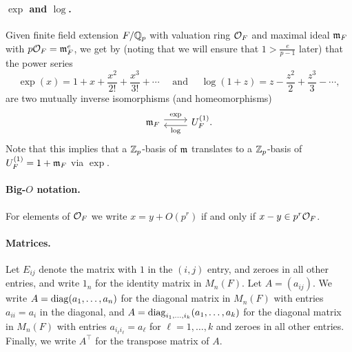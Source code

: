 \paragraph{$\exp$ and $\log$.} Given finite field extension $F/\mathbb{Q}_{p}$ with valuation ring $\mathcal{O}_{F}$ and maximal ideal $\mathfrak{m}_{F}$ with $p\mathcal{O}_{F} = \mathfrak{m}_{F}^{e}$, we get by \cite[Prop.~(5.5)]{Neukirch} (noting that we will ensure that $1 > \frac{e}{p-1}$ later) that the power series
\begin{equation*}
  \exp(x) = 1 + x + \frac{x^{2}}{2!} + \frac{x^{3}}{3!} + \dotsb \quad \text{ and } \quad \log(1+z) = z - \frac{z^{2}}{2} + \frac{z^{3}}{3} - \dotsb,
\end{equation*}
are two mutually inverse isomorphisms (and homeomorphisms)
\[
  \begin{tikzcd}
    \idm_{F} \ar[r, yshift=0.7ex, "\exp"] & U_{F}^{(1)}. \ar[l, yshift=-0.7ex, "\log"]
  \end{tikzcd}
\]
Note that this implies that a $\mathbb{Z}_{p}$-basis of $\mathfrak{m}$ translates to a $\mathbb{Z}_{p}$-basis of $U_{F}^{(1)} = 1+\mathfrak{m}_{F}$ via $\exp$.

\paragraph{Big-$O$ notation.} For elements of $\mathcal{O}_{F}$ we write $x = y + O(p^{r})$ if and only if $x-y \in p^{r}\mathcal{O}_{F}$.

\paragraph{Matrices.} Let $E_{ij}$ denote the matrix with $1$ in the $(i,j)$ entry, and zeroes in all other entries, and write $1_{n}$ for the identity matrix in $M_{n}(F)$. Let $A = (a_{ij})$. We write $A = \operatorname{diag}(a_{1},\dotsc,a_{n})$ for the diagonal matrix in $M_{n}(F)$ with entries $a_{ii}=a_{i}$ in the diagonal, and $A = \operatorname{diag}_{i_{1},\dotsc,i_{k}}(a_{1},\dotsc,a_{k})$ for the diagonal matrix in $M_{n}(F)$ with entries $a_{i_{\ell}i_{\ell}} = a_{\ell}$ for $\ell = 1,\dotsc,k$ and zeroes in all other entries. Finally, we write $A^{\top}$ for the transpose matrix of $A$.

